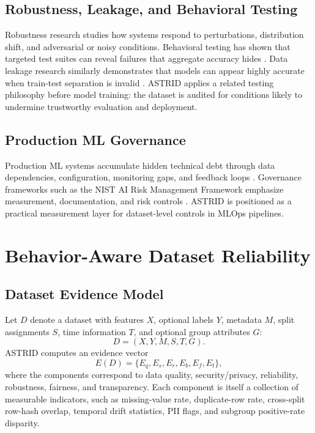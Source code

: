 \documentclass[runningheads]{llncs}
\begin{document}
\subsection{Robustness, Leakage, and Behavioral Testing}

Robustness research studies how systems respond to perturbations, distribution
shift, and adversarial or noisy conditions. Behavioral testing has shown that
targeted test suites can reveal failures that aggregate accuracy hides
\cite{ribeiro2020}. Data leakage research similarly demonstrates that models can
appear highly accurate when train-test separation is invalid \cite{kaufman2012}.
ASTRID applies a related testing philosophy before model training: the dataset is
audited for conditions likely to undermine trustworthy evaluation and deployment.

\subsection{Production ML Governance}

Production ML systems accumulate hidden technical debt through data dependencies,
configuration, monitoring gaps, and feedback loops \cite{sculley2015,
amershi2019}. Governance frameworks such as the NIST AI Risk Management Framework
emphasize measurement, documentation, and risk controls \cite{nist2023}. ASTRID
is positioned as a practical measurement layer for dataset-level controls in
MLOps pipelines.

\section{Behavior-Aware Dataset Reliability}

\subsection{Dataset Evidence Model}

Let $D$ denote a dataset with features $X$, optional labels $Y$, metadata $M$,
split assignments $S$, time information $T$, and optional group attributes $G$:
\[
D = (X, Y, M, S, T, G).
\]
ASTRID computes an evidence vector
\[
E(D) = \{E_q, E_s, E_r, E_b, E_f, E_t\},
\]
where the components correspond to data quality, security/privacy, reliability,
robustness, fairness, and transparency. Each component is itself a collection of
measurable indicators, such as missing-value rate, duplicate-row rate,
cross-split row-hash overlap, temporal drift statistics, PII flags, and subgroup
positive-rate disparity.
\end{document}
